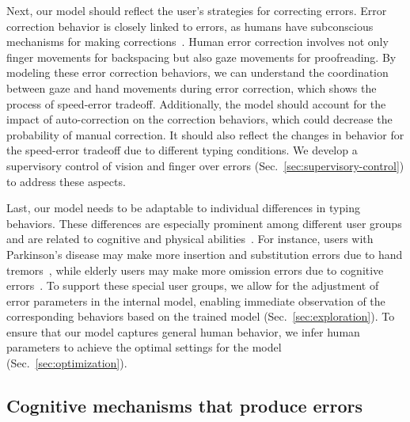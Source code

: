 Next, our model should reflect the user's strategies for correcting errors. Error correction behavior is closely linked to errors, as humans have subconscious mechanisms for making corrections~\cite{pinet2022correction}. Human error correction involves not only finger movements for backspacing but also gaze movements for proofreading. By modeling these error correction behaviors, we can understand the coordination between gaze and hand movements during error correction, which shows the process of speed-error tradeoff. 
Additionally, the model should account for the impact of auto-correction on the correction behaviors, which could decrease the probability of manual correction. It should also reflect the changes in behavior for the speed-error tradeoff due to different typing conditions. We develop a supervisory control of vision and finger over errors (Sec.~\ref{sec:supervisory-control}) to address these aspects.

Last, our model needs to be adaptable to individual differences in typing behaviors. These differences are especially prominent among different user groups and are related to cognitive and physical abilities~\cite{sarcar2016towards, sarcar2018ability}. For instance, users with Parkinson's disease may make more insertion and substitution errors due to hand tremors~\cite{wang2021facilitating}, while elderly users may make more omission errors due to cognitive errors~\cite{nicolau2012elderly}. 
To support these special user groups, we allow for the adjustment of error parameters in the internal model, enabling immediate observation of the corresponding behaviors based on the trained model (Sec.~\ref{sec:exploration}). To ensure that our model captures general human behavior, we infer human parameters to achieve the optimal settings for the model (Sec.~\ref{sec:optimization}).

\subsection{Cognitive mechanisms that produce errors}
\label{sec:errors-generating}

